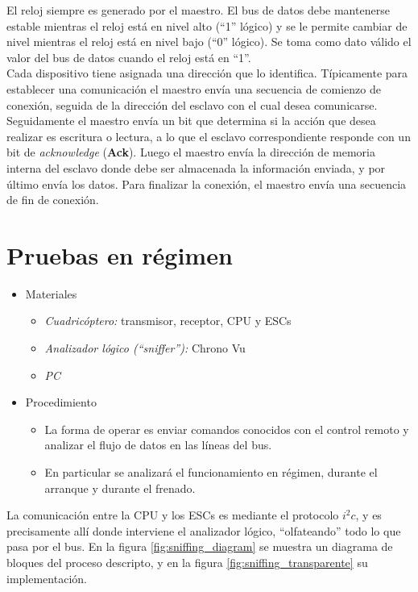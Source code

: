 \documentclass[main]{subfiles}
\begin{document}
El reloj siempre es generado por el maestro. El bus de datos debe mantenerse estable mientras el reloj está en nivel alto (``1'' lógico) y se le permite cambiar de nivel mientras el reloj está en nivel bajo (``0'' lógico). Se toma como dato válido el valor del bus de datos cuando el reloj está en ``1''.\\

Cada dispositivo tiene asignada una direcci\'on que lo identifica. Típicamente para establecer una comunicaci\'on el maestro env\'ia una secuencia de comienzo de conexi\'on, seguida de la direcci\'on del esclavo con el cual desea comunicarse. Seguidamente el maestro env\'ia un bit que determina si la acci\'on que desea realizar es escritura o lectura, a lo que el esclavo correspondiente responde con un bit de \emph{acknowledge} (\textbf{Ack}). Luego el maestro env\'ia la direcci\'on de memoria interna del esclavo donde debe ser almacenada la informaci\'on enviada, y por \'ultimo env\'ia los datos. Para finalizar la conexi\'on, el maestro env\'ia una secuencia de fin de conexi\'on.

\section{Pruebas en r\'egimen}

\begin{itemize}
	\item Materiales
	\begin{itemize}
		\item \emph{Cuadricóptero:} transmisor, receptor, CPU y ESCs
		\item \emph{Analizador lógico (``sniffer''):} Chrono Vu
		\item \emph{PC}
	\end{itemize}
	\item Procedimiento
	\begin{itemize}
		\item La forma de operar es enviar comandos conocidos con el control remoto y analizar el flujo de datos en las l\'ineas del bus.
		\item En particular se analizará el funcionamiento en régimen, durante el arranque y durante el frenado.
	\end{itemize}
\end{itemize}

La comunicación entre la CPU y los ESCs es mediante el protocolo $i^2c$, y es precisamente allí donde interviene el analizador lógico, ``olfateando'' todo lo que pasa por el bus. En la figura \ref{fig:sniffing_diagram} se muestra un diagrama de bloques del proceso descripto, y en la figura \ref{fig:sniffing_transparente} su implementación.
\end{document}
